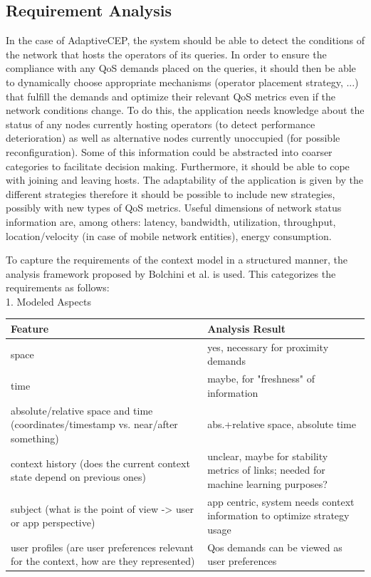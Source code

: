 \subsection{Requirement Analysis}
In the case of AdaptiveCEP, the system should be able to detect the conditions of the network that hosts the operators of its queries. In order to ensure the compliance with any QoS demands placed on the queries, it should then be able to dynamically choose appropriate mechanisms (operator placement strategy, ...) that fulfill the demands and optimize their relevant QoS metrics even if the network conditions change. 
To do this, the application needs knowledge about the status of any nodes currently hosting operators (to detect performance deterioration) as well as alternative nodes currently unoccupied (for possible reconfiguration).
Some of this information could be abstracted into coarser categories to facilitate decision making.
Furthermore, it should be able to cope with joining and leaving hosts. 
The adaptability of the application is given by the different strategies therefore it should be possible to include new strategies, possibly with new types of QoS metrics. Useful dimensions of network status information are, among others: latency, bandwidth, utilization, throughput, location/velocity (in case of mobile network entities), energy consumption.

To capture the requirements of the context model in a structured manner, the analysis framework proposed by Bolchini et al. is used. This categorizes the requirements as follows: \\
1. Modeled Aspects \\
\newline
\begin{tabularx}{\textwidth}{|X|X|}
\hline
\textbf{Feature} & \textbf{Analysis Result} \\
\hline 
space & yes, necessary for proximity demands \\ 
\hline 
time & maybe, for "freshness" of information \\ 
\hline 
absolute/relative space and time (coordinates/timestamp vs. near/after something)  & abs.+relative space, absolute time \\ 
\hline 
context history (does the current context state depend on previous ones)  & unclear, maybe for stability metrics of links; needed for machine learning purposes? \\ 
\hline 
subject (what is the point of view -> user or app perspective) & app centric, system needs context information to optimize strategy usage \\ 
\hline 
user profiles (are user preferences relevant for the context, how are they represented) & Qos demands can be viewed as user preferences \\ 
\hline 
\end{tabularx} 


